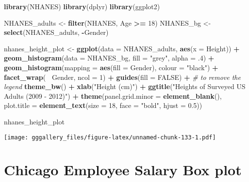 \documentclass[]{book}
\newenvironment{Shaded}{\begin{snugshade}}{\end{snugshade}}
\newcommand{\CommentTok}[1]{\textcolor[rgb]{0.56,0.35,0.01}{\textit{#1}}}
\newcommand{\DataTypeTok}[1]{\textcolor[rgb]{0.13,0.29,0.53}{#1}}
\newcommand{\DecValTok}[1]{\textcolor[rgb]{0.00,0.00,0.81}{#1}}
\newcommand{\FloatTok}[1]{\textcolor[rgb]{0.00,0.00,0.81}{#1}}
\newcommand{\KeywordTok}[1]{\textcolor[rgb]{0.13,0.29,0.53}{\textbf{#1}}}
\newcommand{\NormalTok}[1]{#1}
\newcommand{\OperatorTok}[1]{\textcolor[rgb]{0.81,0.36,0.00}{\textbf{#1}}}
\newcommand{\OtherTok}[1]{\textcolor[rgb]{0.56,0.35,0.01}{#1}}
\newcommand{\StringTok}[1]{\textcolor[rgb]{0.31,0.60,0.02}{#1}}
\begin{document}
\begin{Shaded}
\begin{Highlighting}[]
\KeywordTok{library}\NormalTok{(NHANES)}
\KeywordTok{library}\NormalTok{(dplyr)}
\KeywordTok{library}\NormalTok{(ggplot2)}


\NormalTok{NHANES_adults <-}\StringTok{ }\KeywordTok{filter}\NormalTok{(NHANES, Age }\OperatorTok{>=}\StringTok{ }\DecValTok{18}\NormalTok{) }
\NormalTok{NHANES_bg <-}\StringTok{ }\KeywordTok{select}\NormalTok{(NHANES_adults, }\OperatorTok{-}\NormalTok{Gender) }


\NormalTok{nhanes_height_plot <-}\StringTok{ }\KeywordTok{ggplot}\NormalTok{(}\DataTypeTok{data =}\NormalTok{ NHANES_adults, }\KeywordTok{aes}\NormalTok{(}\DataTypeTok{x =}\NormalTok{ Height)) }\OperatorTok{+}
\StringTok{  }\KeywordTok{geom_histogram}\NormalTok{(}\DataTypeTok{data =}\NormalTok{ NHANES_bg, }\DataTypeTok{fill =} \StringTok{"grey"}\NormalTok{, }\DataTypeTok{alpha =} \FloatTok{.4}\NormalTok{) }\OperatorTok{+}
\StringTok{  }\KeywordTok{geom_histogram}\NormalTok{(}\DataTypeTok{mapping =} \KeywordTok{aes}\NormalTok{(}\DataTypeTok{fill =}\NormalTok{ Gender), }\DataTypeTok{colour =} \StringTok{"black"}\NormalTok{) }\OperatorTok{+}
\StringTok{  }\KeywordTok{facet_wrap}\NormalTok{(}\OperatorTok{~}\StringTok{ }\NormalTok{Gender, }\DataTypeTok{ncol =} \DecValTok{1}\NormalTok{) }\OperatorTok{+}
\StringTok{  }\KeywordTok{guides}\NormalTok{(}\DataTypeTok{fill =} \OtherTok{FALSE}\NormalTok{) }\OperatorTok{+}\StringTok{  }\CommentTok{# to remove the legend}
\StringTok{  }\KeywordTok{theme_bw}\NormalTok{() }\OperatorTok{+}\StringTok{ }\KeywordTok{xlab}\NormalTok{(}\StringTok{"Height (cm)"}\NormalTok{) }\OperatorTok{+}\StringTok{ }\KeywordTok{ggtitle}\NormalTok{(}\StringTok{"Heights of Surveyed US Adults (2009 - 2012)"}\NormalTok{)  }\OperatorTok{+}\StringTok{ }
\StringTok{  }\KeywordTok{theme}\NormalTok{(}\DataTypeTok{panel.grid.minor =} \KeywordTok{element_blank}\NormalTok{(), }
        \DataTypeTok{plot.title =} \KeywordTok{element_text}\NormalTok{(}\DataTypeTok{size =} \DecValTok{18}\NormalTok{, }\DataTypeTok{face =} \StringTok{"bold"}\NormalTok{, }\DataTypeTok{hjust =} \FloatTok{0.5}\NormalTok{))}
  

\NormalTok{nhanes_height_plot}
\end{Highlighting}
\end{Shaded}

\texttt{[image: gggallery\_files/figure-latex/unnamed-chunk-133-1.pdf]}

\hypertarget{chibox}{%
\chapter*{Chicago Employee Salary Box plot}\label{chibox}}
\end{document}

